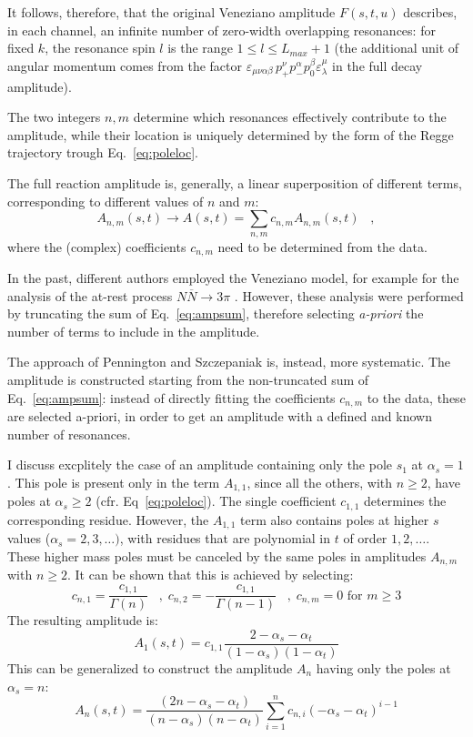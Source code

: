 \documentclass[a4paper,10pt]{report}
\begin{document}
It follows, therefore, that the original Veneziano amplitude $F(s,t,u)$ describes, in each channel,
an infinite number of zero-width overlapping resonances: for fixed $k$, the resonance spin $l$ is the range $1 \leq l \leq L_{max}+1$ 
(the additional unit of angular momentum comes from the factor $\varepsilon_{\mu \nu \alpha \beta}\, p^{\nu}_{+}p^{\alpha}_{-}p^{\beta}_{0}\varepsilon^{\mu}_{\lambda}$ in the full decay amplitude).

The two integers $n,m$ determine which resonances effectively contribute to the amplitude, while their location is uniquely determined by the form of the Regge trajectory trough Eq.~\ref{eq:poleloc}.

The full reaction amplitude is, generally, a linear superposition of different terms, corresponding to different values of $n$ and $m$:
\begin{equation}\label{eq:ampsum}
A_{n,m}(s,t) \rightarrow A(s,t) = \sum_{n,m} c_{n,m}A_{n,m}(s,t) \; \; \; ,
\end{equation}
where the (complex) coefficients $c_{n,m}$ need to be determined from the data.

In the past, different authors employed the Veneziano model, for example for the analysis of the at-rest process $N\overline{N}\rightarrow 3\pi$ \cite{Lovelace,Altarelli,Gopal}.
However, these analysis were performed by truncating the sum of Eq.~\ref{eq:ampsum}, therefore selecting \textit{a-priori} the number of terms to include in the amplitude.

The approach of Pennington and Szczepaniak is, instead, more systematic. 
The amplitude is constructed starting from the non-truncated sum of Eq.~\ref{eq:ampsum}: instead of directly fitting the coefficients $c_{n,m}$ to the data, these are
selected a-priori, in order to get an amplitude with a defined and known number of resonances. 

I discuss excplitely the case of an amplitude containing only the pole $s_1$ at $\alpha_s=1$. This pole is present only in the term $A_{1,1}$, since all the others, with $n\geq2$,
have poles at $\alpha_s\geq2$ (cfr. Eq~\ref{eq:poleloc}). The single coefficient $c_{1,1}$ determines the corresponding residue.
However, the $A_{1,1}$ term also contains poles at higher $s$ values ($\alpha_s=2,3,\ldots)$, with residues that are polynomial in $t$ of order $1,2,\ldots$.
These higher mass poles must be canceled by the same poles in amplitudes $A_{n,m}$ with $n\geq2$. It can be shown that this is achieved by selecting:
\begin{equation}
c_{n,1} = \frac{c_{1,1}}{\Gamma(n)} \; \; \; , \;  c_{n,2} = - \frac{c_{1,1}}{\Gamma(n-1)} \; \; \; , \; c_{n,m} = 0 \mbox{ for $m\geq 3$}
\end{equation}
The resulting amplitude is:
\begin{equation}
A_{1}(s,t)=c_{1,1}\frac{2-\alpha_s-\alpha_t}{(1-\alpha_s)(1-\alpha_t)}
\end{equation}
This can be generalized to construct the amplitude $A_{n}$ having only the poles at $\alpha_s=n$:
\begin{equation}
A_{n}(s,t)=\frac{(2n-\alpha_s-\alpha_t)}{(n-\alpha_s)(n-\alpha_t)}\sum_{i=1}^n c_{n,i} (-\alpha_s-\alpha_t)^{i-1}
\end{equation}
\end{document}
